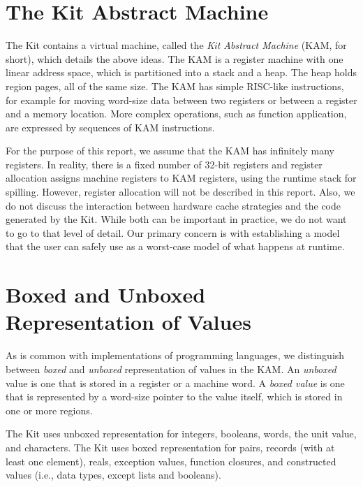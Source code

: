 \documentclass[12pt]{book}
\begin{document}
\section{The Kit Abstract Machine}
%
The Kit contains a virtual machine, called
the {\em Kit Abstract Machine\/} (KAM, for short), which details the
above ideas. The KAM is a register machine with one linear address
space, which is partitioned into a stack and a heap. The heap holds
region pages, all of the same size.  The KAM has simple RISC-like
instructions, for example for moving word-size data between two
registers or between a register and a memory location.  More complex
operations, such as function application, are expressed by sequences
of KAM instructions.

For the purpose of this report, we assume that the KAM has infinitely
many registers.  In reality, there is a fixed number of 32-bit
registers
%
and register allocation assigns machine registers to KAM registers,
using the runtime stack for spilling. However, register allocation
will not be described in this report.
Also, we do not discuss the interaction between hardware cache strategies and
the code generated by the Kit. While both can be important in practice, we do not want
to go to that level of detail. Our primary concern is with establishing a model that
the user can safely use as a worst-case model of what happens at runtime.

\section{Boxed and Unboxed Representation of Values}
\label{boxing.sec}
As is common with implementations of programming languages, 
we distinguish between {\em boxed\/} and {\em unboxed\/} representation
of values in the KAM.
An {\em unboxed\/} value is one that is stored in a register or
a machine word. A {\em boxed value\/} is one that is represented by
a word-size pointer to the value itself, which is stored in one or more
regions.

The Kit uses unboxed representation for integers, booleans, words, the
unit value, and characters.  The Kit uses boxed representation for
pairs, records (with at least one element), reals, exception values,
function closures, and constructed values (i.e., data types, except
lists and booleans).
\end{document}
